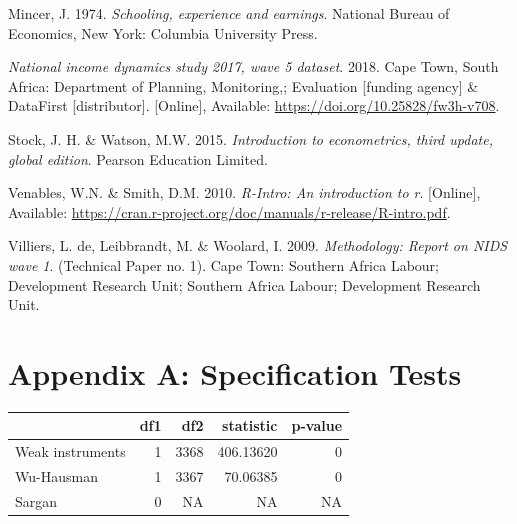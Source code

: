 \documentclass[11pt,preprint, authoryear]{elsarticle}
\let\origtable\table
\let\endorigtable\endtable
\renewenvironment{table}[1][2] {
    \expandafter\origtable\expandafter[H]
} {
    \endorigtable
}
\numberwithin{equation}{section}
\numberwithin{figure}{section}
\numberwithin{table}{section}
\newlength{\cslhangindent}
\newenvironment{CSLReferences}%
  {\setlength{\parindent}{0pt}%
  \everypar{\setlength{\hangindent}{\cslhangindent}}\ignorespaces}%
  {\par}
\begin{document}
\begin{CSLReferences}{1}{0}
\leavevmode\hypertarget{ref-mince}{}%
Mincer, J. 1974. \emph{Schooling, experience and earnings}. National
Bureau of Economics, New York: Columbia University Press.

\leavevmode\hypertarget{ref-nids}{}%
\emph{National income dynamics study 2017, wave 5 dataset}. 2018. Cape
Town, South Africa: Department of Planning, Monitoring,; Evaluation
{[}funding agency{]} \& DataFirst {[}distributor{]}. {[}Online{]},
Available: \url{https://doi.org/10.25828/fw3h-v708}.

\leavevmode\hypertarget{ref-metrics}{}%
Stock, J. H. \& Watson, M.W. 2015. \emph{Introduction to econometrics,
third update, global edition}. Pearson Education Limited.

\leavevmode\hypertarget{ref-metrics1}{}%
Venables, W.N. \& Smith, D.M. 2010. \emph{{R-Intro}: {A}n introduction
to r}. {[}Online{]}, Available:
\url{https://cran.r-project.org/doc/manuals/r-release/R-intro.pdf}.

\leavevmode\hypertarget{ref-nids1}{}%
Villiers, L. de, Leibbrandt, M. \& Woolard, I. 2009. \emph{Methodology:
Report on NIDS wave 1}. (Technical Paper no. 1). Cape Town: Southern
Africa Labour; Development Research Unit; Southern Africa Labour;
Development Research Unit.

\end{CSLReferences}

\newpage

\hypertarget{appendix-a-specification-tests}{%
\section*{\texorpdfstring{Appendix A: Specification Tests
\label{appendixA}}{Appendix A: Specification Tests }}\label{appendix-a-specification-tests}}

\begin{table}

\caption{\label{tab:Specification}Specification Tests for Father's Education \label{FE}}
\centering
\begin{tabular}[t]{l|r|r|r|r}
\hline
  & df1 & df2 & statistic & p-value\\
\hline
Weak instruments & 1 & 3368 & 406.13620 & 0\\
\hline
Wu-Hausman & 1 & 3367 & 70.06385 & 0\\
\hline
Sargan & 0 & NA & NA & NA\\
\hline
\end{tabular}
\end{table}
\end{document}
